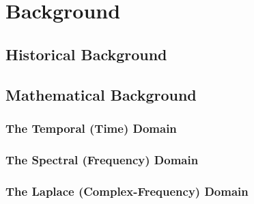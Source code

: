 \documentclass[twoside]{article}
\begin{document}
\section{Background} \label{Background}
\subsection{Historical Background} \label{Background:History}

\subsection{Mathematical Background} \label{Background:Math}

\subsubsection{The Temporal (Time) Domain} \label{Background:Math:Temporal}

\subsubsection{The Spectral (Frequency) Domain} \label{Background:Math:Spectral}

\subsubsection{The Laplace (Complex-Frequency) Domain} \label{Background:Math:Laplace}

\end{document}
